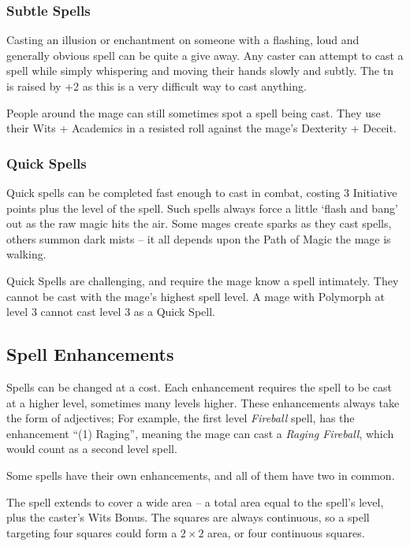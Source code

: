 \begin{multicols}{2}
\subsubsection{Subtle Spells}

Casting an illusion or enchantment on someone with a flashing, loud and generally obvious spell can be quite a give away. Any caster can attempt to cast a spell while simply whispering and moving their hands slowly and subtly.  The \gls{tn} is raised by +2 as this is a very difficult way to cast anything.

People around the mage can still sometimes spot a spell being cast. They use their Wits + Academics in a resisted roll against the mage's Dexterity + Deceit.

\subsubsection{Quick Spells}

Quick spells can be completed fast enough to cast in combat, costing 3 Initiative points plus the level of the spell.
Such spells always force a little `flash and bang' out as the raw magic hits the air.
Some mages create sparks as they cast spells, others summon dark mists -- it all depends upon the Path of Magic the mage is walking.

Quick Spells are challenging, and require the mage know a spell intimately.  They cannot be cast with the mage's highest spell level.  A mage with Polymorph at level 3 cannot cast level 3 as a Quick Spell.

\subsection{Spell Enhancements}

Spells can be changed at a cost.
Each enhancement requires the spell to be cast at a higher level, sometimes many levels higher.
These enhancements always take the form of adjectives;
For example, the first level \textit{Fireball} spell, has the enhancement ``(1) Raging'', meaning the mage can cast a \textit{Raging Fireball}, which would count as a second level spell.

Some spells have their own enhancements, and all of them have two in common.

The spell extends to cover a wide area -- a total area equal to the spell's level, plus the caster's Wits Bonus.
The squares are always continuous, so a spell targeting four squares could form a $2\times 2$ area, or four continuous squares.


\end{multicols}
